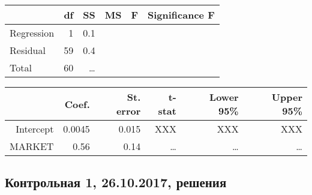\begin{enumerate}
\begin{tabular}{lrrrrr} \toprule
      	   	 &  df 	& SS		& MS 	& F & Significance F \\
\midrule
Regression   & 1 	& 0.1  	& 	 	&  	& 		\\
Residual     & 59  	& 0.4  	&     	&  	&     	\\
Total        & 60  	& \ldots  	&    	&  	&     	\\
\bottomrule
\end{tabular}


\begin{tabular}{rrrrrr}
  \hline
 			& Coef. 	& St. error	& t-stat 	& Lower 95\% 	& Upper 95\% \\
  \hline
Intercept 	& 0.0045 	& 0.015 	& XXX 		& XXX 			& XXX \\
MARKET		& 0.56 		& 0.14 		& \ldots 	& \ldots 		& \ldots \\
   \hline
\end{tabular}

\end{enumerate}




\subsection{Контрольная 1, 26.10.2017, решения}

